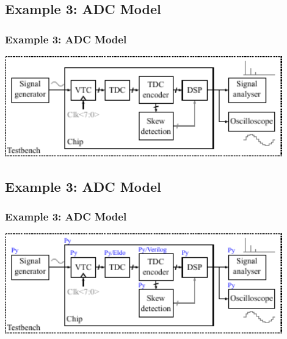 \documentclass{sdkslides}
\begin{document}
\renewcommand{\sectionname}{Example 3: ADC Model}
\subsection*{\sectionname} 
\begin{frame}[c]
    \frametitle{\sectionname}
    \begin{center}
        \includegraphics[width=0.9\textwidth]{Pics/sdk_model_1}
    \end{center}
\end{frame}

\renewcommand{\sectionname}{Example 3: ADC Model}
\subsection*{\sectionname} 
\begin{frame}[c]
    \frametitle{\sectionname}
    \begin{center}
        \includegraphics[width=0.9\textwidth]{Pics/sdk_model_2}
    \end{center}
\end{frame}

\renewcommand{\sectionname}{Example 3: ADC Model}
\end{document}
